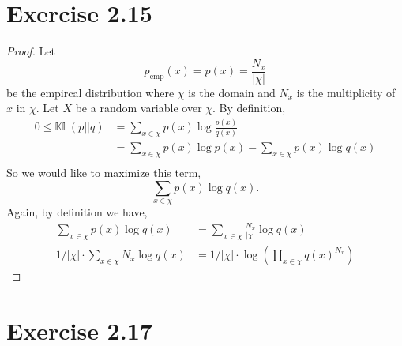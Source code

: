 \documentclass[12pt]{article}
\newcommand{\KL}[2]{\mathbb{KL}(#1||#2)}
\begin{document}
\section*{Exercise 2.15}
\begin{proof}
    Let \[p_{\text{emp}}(x) = p(x) = \frac{N_x}{|\chi|}\] be the empircal
    distribution where $\chi$ is the domain and $N_x$ is the multiplicity of
    $x$ in $\chi$. Let $X$ be a random variable over $\chi$. By definition,
    \begin{align*}
        0 \leq \KL{p}{q} &= \sum_{x \in \chi} p(x) \log \frac{p(x)}{q(x)}\\
        &= \sum_{x \in \chi} p(x) \log p(x) - \sum_{x \in \chi} p(x) \log q(x)\\
    \end{align*}
    So we would like to maximize this term,
    \[\sum_{x \in \chi} p(x) \log q(x).\]
    Again, by definition we have,
    \begin{align*}
    \sum_{x \in \chi} p(x) \log q(x) &= \sum_{x \in \chi} \frac{N_x}{|\chi|} \log q(x)\\
    1/|\chi| \cdot \sum_{x \in \chi} N_x \log q(x) &= 1/|\chi| \cdot \log \left(
        \prod_{x \in \chi} q(x)^{N_x} \right)
    \end{align*}
\end{proof}

\section*{Exercise 2.17}
\end{document}
